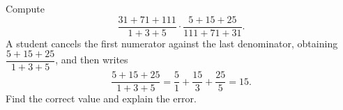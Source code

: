 Compute
\[\dfrac{31+71+111}{1+3+5}\cdot\dfrac{5+15+25}{111+71+31}.\]
A student cancels the first numerator against the last denominator, obtaining $\dfrac{5+15+25}{1+3+5}$, and then writes
\[\dfrac{5+15+25}{1+3+5}=\dfrac{5}{1}+\dfrac{15}{3}+\dfrac{25}{5}=15 .\]
Find the correct value and explain the error.
